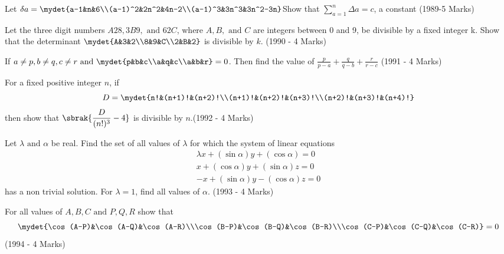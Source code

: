 \item Let $\delta a=\mydet{a-1&n&6\\(a-1)^2&2n^2&4n-2\\(a-1)^3&3n^3&3n^2-3n}\\$Show that $\displaystyle\sum_{a=1}^{n}\Delta a=c$, a constant \hfill (1989-5 Marks)\\[2pt]

\item Let the three digit numbers $A28, 3B9,\text{ and }62C$, where $A, B, \text{ and }C$ are integers between 0 and 9, be divisible by a fixed integer k. Show that the determinant $\mydet{A&3&2\\8&9&C\\2&B&2}$ is divisible by $k$. \hfill (1990 - 4 Marks)\\[2pt]

\item If $a\neq p, b\neq q, c\neq r\text{ and }\mydet{p&b&c\\a&q&c\\a&b&r}=0$. Then find the value of $\displaystyle\frac{p}{p-a}+\frac{q}{q-b}+\frac{r}{r-c}$ \hfill (1991 - 4 Marks)\\[2pt]

\item For a fixed positive integer $n$, if $$D=\mydet{n!&(n+1)!&(n+2)!\\(n+1)!&(n+2)!&(n+3)!\\(n+2)!&(n+3)!&(n+4)!}$$ then show that $\displaystyle\sbrak{\frac{D}{(n!)^3}-4}$ is divisible by $n$.\hfill (1992 - 4 Marks)\\[2pt]

\item Let $\lambda\text{ and }\alpha$ be real. Find the set of all values of $\lambda$ for which the system of linear equations \begin{align*}\lambda x+(\sin\alpha)y+(\cos\alpha)=0\\ x+(\cos\alpha)y+(\sin\alpha)z=0\\-x+(\sin\alpha)y-(\cos\alpha)z=0\end{align*} has a non trivial solution. For $\lambda = 1$, find all values of $\alpha$. \hfill (1993 - 4 Marks)\\[2pt]

\item For all values of $A,B,C\text{ and }P,Q,R$ show that $$\mydet{\cos(A-P)&\cos(A-Q)&\cos(A-R)\\\cos(B-P)&\cos(B-Q)&\cos(B-R)\\\cos(C-P)&\cos(C-Q)&\cos(C-R)}=0$$ \hfill (1994 - 4 Marks)\\[2pt]

